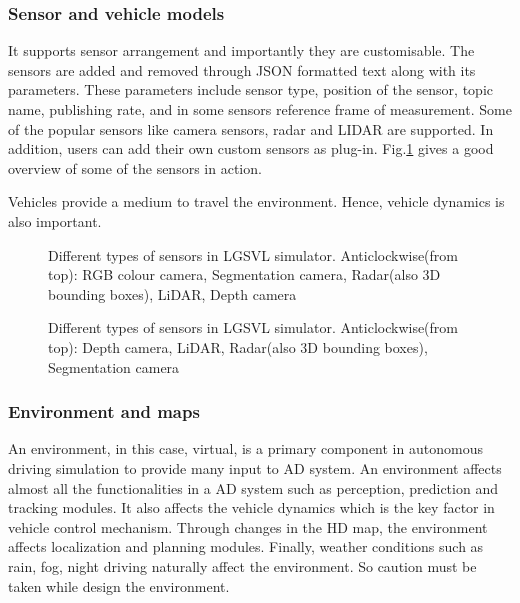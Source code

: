 \subsubsection*{Sensor and vehicle models}
It supports sensor arrangement and importantly they are customisable. The sensors are
added and removed through JSON formatted text along with its parameters. These parameters
include sensor type, position of the sensor, topic name, publishing rate, and in some
sensors reference frame of measurement. Some of the popular sensors like camera sensors,
radar and LIDAR are supported. In addition, users can add their own custom sensors as
plug-in. Fig.\ref{fig:sensortypeslgsvl} gives a good overview of some of the sensors in action.

Vehicles provide a medium to travel the environment. Hence, vehicle dynamics is also
important.

\begin{figure}[!ht]
    \centering
    \def\svgwidth{0.9\columnwidth}
    
    \caption{Different types of sensors in LGSVL simulator. Anticlockwise(from top): RGB
    colour camera, Segmentation camera, Radar(also 3D bounding boxes), LiDAR, Depth camera}
    \label{fig:sensortypeslgsvl}
\end{figure}

\begin{figure}[!ht]
    \centering
    \def\svgwidth{0.9\columnwidth}
    
    \caption{Different types of sensors in LGSVL simulator. Anticlockwise(from top): Depth
    camera, LiDAR, Radar(also 3D bounding boxes), Segmentation camera}
    \label{fig:sensortypeslgsvlnew}
\end{figure}

\subsubsection*{Environment and maps}
An environment, in this case, virtual, is a primary component in autonomous driving
simulation to provide many input to AD system. An environment affects almost all the
functionalities in a AD system such as perception, prediction and tracking modules. It
also affects the vehicle dynamics which is the key factor in vehicle control mechanism.
Through changes in the HD map, the environment affects localization and planning modules.
Finally, weather conditions such as rain, fog, night driving naturally affect the
environment. So caution must be taken while design the environment.

